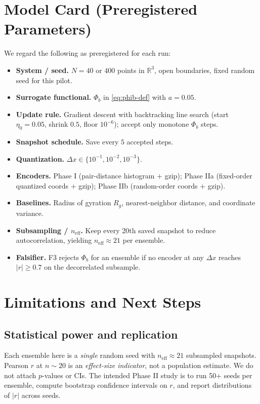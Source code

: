\documentclass[11pt,a4paper]{article}
\newcommand{\phib}{\Phi_b}
\newcommand{\R}{\mathbb{R}}
\begin{document}
\section{Model Card (Preregistered Parameters)}
We regard the following as preregistered for each run:
\begin{itemize}
\item \textbf{System / seed.} $N{=}40$ or $400$ points in $\R^3$, open boundaries, fixed random seed for this pilot.
\item \textbf{Surrogate functional.} $\phib$ in \cref{eq:phib-def} with $a=0.05$.
\item \textbf{Update rule.} Gradient descent with backtracking line search (start $\eta_0{=}0.05$, shrink $0.5$, floor $10^{-6}$); accept only monotone $\phib$ steps.
\item \textbf{Snapshot schedule.} Save every $5$ accepted steps.
\item \textbf{Quantization.} $\Delta x \in \{10^{-1},10^{-2},10^{-3}\}$.
\item \textbf{Encoders.} Phase I (pair-distance histogram $+$ gzip); Phase IIa (fixed-order quantized coords $+$ gzip); Phase IIb (random-order coords $+$ gzip).
\item \textbf{Baselines.} Radius of gyration $R_g$, nearest-neighbor distance, and coordinate variance.
\item \textbf{Subsampling / $n_{\text{eff}}$.} Keep every 20th saved snapshot to reduce autocorrelation, yielding $n_{\text{eff}}\approx 21$ per ensemble.
\item \textbf{Falsifier.} F3 rejects $\phib$ for an ensemble if no encoder at any $\Delta x$ reaches $|r|\ge0.7$ on the decorrelated subsample.
\end{itemize}

\section{Limitations and Next Steps}
\subsection*{Statistical power and replication}
Each ensemble here is a \emph{single} random seed with $n_{\text{eff}}\!\approx\!21$ subsampled snapshots. Pearson $r$ at $n{\sim}20$ is an \emph{effect-size indicator}, not a population estimate. We do not attach $p$-values or CIs. The intended Phase II study is to run 50+ seeds per ensemble, compute bootstrap confidence intervals on $r$, and report distributions of $|r|$ across seeds.
\end{document}
